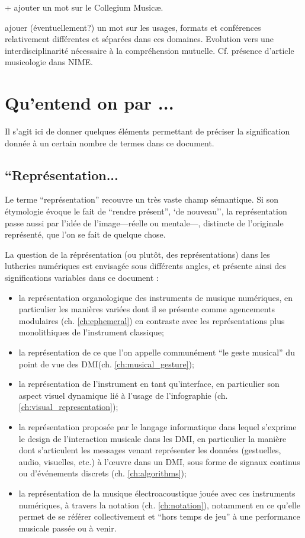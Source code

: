 + ajouter un mot sur le Collegium Musicæ.

ajouer (éventuellement?) un mot sur les usages, formats et conférences relativement différentes et séparées dans ces domaines. 
Evolution vers une interdisciplinarité nécessaire à la compréhension mutuelle. Cf. présence d'article musicologie dans NIME.


\section{Qu'entend on par ...}

Il s'agit ici de donner quelques éléments permettant de préciser la signification donnée à un certain nombre de termes dans ce document.

\subsection*{``Représentation...}

Le terme ``représentation'' recouvre un très vaste champ sémantique. Si son étymologie évoque le fait de ``rendre présent'', `de nouveau'', la représentation passe aussi par l'idée de l'image—réelle ou mentale—, distincte de l'originale représenté, que l'on se fait de quelque chose.

La question de la réprésentation (ou plutôt, des représentations) dans les lutheries numériques est envisagée sous différents angles, et présente ainsi des significations variables dans ce document : 
\vspace{-1em}
\begin{itemize}[noitemsep]
\item la représentation organologique des instruments de musique numériques, en particulier les manières variées dont il se présente comme agencements modulaires (ch. \ref{ch:ephemeral}) en contraste avec les représentations plus monolithiques de l'instrument classique;
\item la représentation de ce que l'on appelle communément ``le geste musical'' du point de vue des \gls{DMI}(ch. \ref{ch:musical_gesture});
\item la représentation de l'instrument en tant qu'interface, en particulier son aspect visuel dynamique lié à l'usage de l'infographie (ch. \ref{ch:visual_representation});
\item la représentation proposée par le langage informatique dans lequel s'exprime le design de l'interaction musicale dans les \gls{DMI}, en particulier la manière dont s'articulent les messages venant représenter les données (gestuelles, audio, visuelles, etc.) à l'œuvre dans un DMI, sous forme de signaux continus ou d'événements discrets (ch. \ref{ch:algorithms});
\item la représentation de la musique électroacoustique jouée avec ces instruments numériques, à travers la notation (ch. \ref{ch:notation}), notamment en ce qu'elle permet de se référer collectivement et ``hors temps de jeu'' à une performance musicale passée ou à venir.
\end{itemize}

